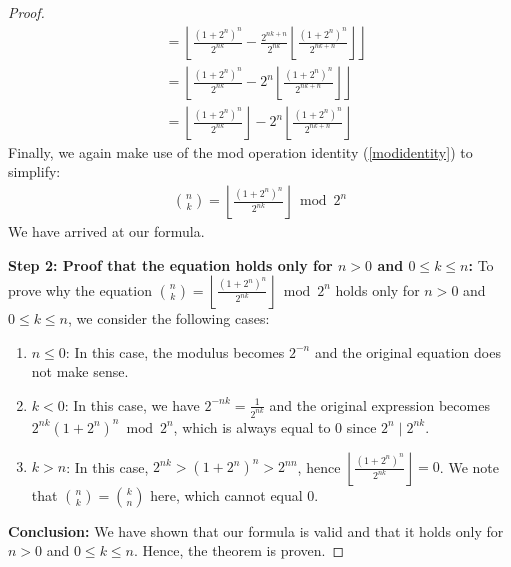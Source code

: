 \documentclass{article}
\theoremstyle{plain}
\theoremstyle{definition}
\begin{document}
\begin{proof}
\begin{align}
    &= \left\lfloor\frac{(1 + 2^{n})^{n}}{2^{n k}} - \frac{2^{n k + n}}{2^{n k}} \left\lfloor \frac{(1 + 2^{n})^{n}}{2^{n k + n}} \right\rfloor\right\rfloor \\
    &= \left\lfloor\frac{(1 + 2^{n})^{n}}{2^{n k}} - 2^{n} \left\lfloor \frac{(1 + 2^{n})^{n}}{2^{n k + n}} \right\rfloor\right\rfloor \\
    &= \left\lfloor\frac{(1 + 2^{n})^{n}}{2^{n k}}\right\rfloor - 2^{n} \left\lfloor \frac{(1 + 2^{n})^{n}}{2^{n k + n}} \right\rfloor \label{eq:binomialviafloors}
\end{align}
Finally, we again make use of the mod operation identity (\ref{modidentity}) to simplify:
\begin{align}
    \binom{n}{k} = \left\lfloor\frac{(1 + 2^{n})^{n}}{2^{n k}}\right\rfloor \bmod{2^{n}}
\end{align}
We have arrived at our formula.

\textbf{Step 2: Proof that the equation holds only for $n > 0$ and $0 \leq k \leq n$:}
To prove why the equation $\binom{n}{k} = \left\lfloor\frac{(1 + 2^n)^n}{2^{nk}}\right\rfloor \bmod{2^n}$ holds only for $n > 0$ and $0 \leq k \leq n$, we consider the following cases:

\begin{enumerate}
    \item $n \leq 0$: In this case, the modulus becomes $2^{-n}$ and the original equation does not make sense.
    
    \item $k < 0$: In this case, we have $2^{-nk} = \frac{1}{2^{nk}}$ and the original expression becomes $2^{nk} (1 + 2^n)^n \bmod{2^n}$, which is always equal to $0$ since $2^{n} \mid 2^{nk}$.
    
    \item $k > n$: In this case, $2^{nk} > (1 + 2^n)^n > 2^{nn}$, hence $\left\lfloor\frac{(1 + 2^n)^n}{2^{nk}}\right\rfloor = 0$. We note that $\binom{n}{k} = \binom{k}{n}$ here, which cannot equal $0$.
\end{enumerate}
\noindent
\textbf{Conclusion:}
We have shown that our formula is valid and that it holds only for $n > 0$ and $0 \leq k \leq n$. Hence, the theorem is proven.
\end{proof}
\end{document}
